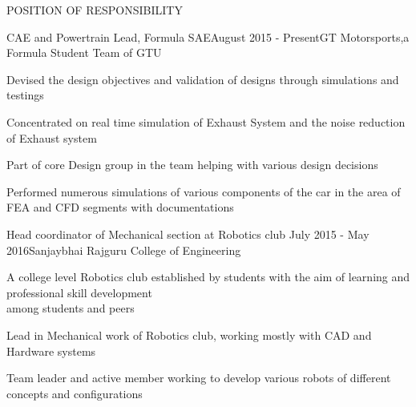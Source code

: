 \documentclass{resume} %
\begin{document}
  
\begin{rSection}{POSITION OF RESPONSIBILITY}

\begin{rSubsection}{CAE and Powertrain Lead, Formula SAE}{August 2015 - Present}{GT Motorsports,a Formula Student Team of GTU}{}              
\item Devised the design objectives and validation of designs through simulations and testings
\item Concentrated on real time simulation of Exhaust System and the noise reduction of Exhaust system
\item Part of core Design group in the team helping with various design decisions  
\item Performed numerous simulations of various components of the car in the area of FEA and CFD segments with documentations   
\end{rSubsection}  


\begin{rSubsection}{Head coordinator of Mechanical section at Robotics club} {July 2015 - May 2016}{Sanjaybhai Rajguru College of Engineering}{} 
\item A college level Robotics club established by students with the aim of learning and professional skill development \\among students and peers            
\item Lead in Mechanical work of Robotics club, working mostly with CAD and Hardware systems
\item Team leader and active member working to develop various robots of different concepts and configurations     
\end{rSubsection}

\end{rSection}
  

\end{document}
